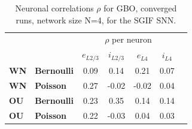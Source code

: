 \documentclass[mphil,deptreport,ianc]{infthesis} %
\begin{document}






\begin{table}
\caption{Neuronal correlations $\rho$ for GBO, converged runs, network size N=4, for the SGIF SNN.}
\label{tab:rho_converged_GBO_pop}
\begin{center}
\begin{tabular}{ l l c c c c c }
 & & \multicolumn{4}{c}{$\rho$ per neuron} \\
 & & $e_{L2/3}$ & $i_{L2/3}$ & $e_{L4}$ & $i_{L4}$ \\
 \textbf{WN} & \textbf{Bernoulli} & 0.09 & 0.14 & 0.21 & 0.07 \\ 
 \textbf{WN} & \textbf{Poisson} & 0.27 & -0.02 & -0.02 & 0.04 \\  
 \textbf{OU} & \textbf{Bernoulli} & 0.23 & 0.35 & 0.14 & 0.14 \\ 
 \textbf{OU} & \textbf{Poisson} & 0.22 & -0.03 & 0.04 & 0.03 \\  
\end{tabular}
\end{center}
\end{table}
\end{document}
